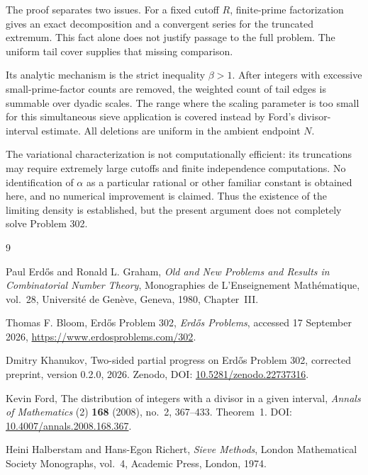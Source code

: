 \documentclass[11pt]{article}
\theoremstyle{definition}
\theoremstyle{remark}
\numberwithin{equation}{section}
\begin{document}
The proof separates two issues. For a fixed cutoff \(R\),
finite-prime factorization gives an exact decomposition and a
convergent series for the truncated extremum. This fact alone
does not justify passage to the full problem. The uniform tail
cover supplies that missing comparison.

Its analytic mechanism is the strict inequality \(\beta>1\).
After integers with excessive small-prime-factor counts are
removed, the weighted count of tail edges is summable over
dyadic scales. The range where the scaling parameter is too
small for this simultaneous sieve application is covered
instead by Ford's divisor-interval estimate. All deletions
are uniform in the ambient endpoint \(N\).

The variational characterization is not computationally efficient:
its truncations may require extremely large cutoffs and finite
independence computations. No identification of \(\alpha\) as a
particular rational or other familiar constant is obtained here, and
no numerical improvement is claimed. Thus the existence of the
limiting density is established, but the present argument does not
completely solve Problem 302.

\begin{thebibliography}{9}
\sloppy

Paul Erd\H{o}s and Ronald L. Graham,
\emph{Old and New Problems and Results in Combinatorial Number Theory},
Monographies de L'Enseignement Math\'ematique, vol.~28,
Universit\'e de Gen\`eve, Geneva, 1980, Chapter~III.

Thomas F. Bloom,
Erd\H{o}s Problem 302,
\emph{Erd\H{o}s Problems}, accessed 17 September 2026,
\url{https://www.erdosproblems.com/302}.

Dmitry Khanukov,
Two-sided partial progress on Erd\H{o}s Problem 302,
corrected preprint, version 0.2.0, 2026.
Zenodo, DOI:
\href{https://doi.org/10.5281/zenodo.22737316}
{10.5281/zenodo.22737316}.

Kevin Ford,
The distribution of integers with a divisor in a given interval,
\emph{Annals of Mathematics} (2) \textbf{168} (2008), no.~2,
367--433.
Theorem~1.
DOI:
\href{https://doi.org/10.4007/annals.2008.168.367}
{10.4007/annals.2008.168.367}.

Heini Halberstam and Hans-Egon Richert,
\emph{Sieve Methods},
London Mathematical Society Monographs, vol.~4,
Academic Press, London, 1974.

\end{thebibliography}
\end{document}
